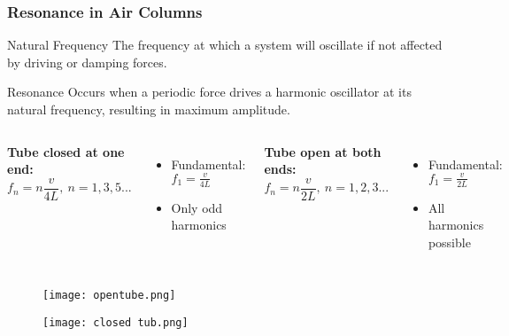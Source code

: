 \documentclass{beamer}
\begin{document}
\begin{frame}
\frametitle{Resonance in Air Columns}
\begin{block}{Natural Frequency}
The frequency at which a system will oscillate if not affected by driving or damping forces.
\end{block}

\begin{block}{Resonance}
Occurs when a periodic force drives a harmonic oscillator at its natural frequency, resulting in maximum amplitude.
\end{block}

\begin{columns}
\textbf{Tube closed at one end:}
\begin{equation}
f_n = n\frac{v}{4L}, \: n = 1,3,5...
\end{equation}
\begin{itemize}
\item Fundamental: $f_1 = \frac{v}{4L}$
\item Only odd harmonics
\end{itemize}

\textbf{Tube open at both ends:}
\begin{equation}
f_n = n\frac{v}{2L}, \: n = 1,2,3...
\end{equation}
\begin{itemize}
\item Fundamental: $f_1 = \frac{v}{2L}$
\item All harmonics possible
\end{itemize}


\end{columns}
\end{frame}

\begin{frame}{}
    
\begin{figure}
    \centering
    \texttt{[image: opentube.png]}
\end{figure}

\end{frame}
\begin{frame}{}
    
\begin{figure}
    \centering
    \texttt{[image: closed tub.png]}
\end{figure}
\end{frame}

\end{document}

